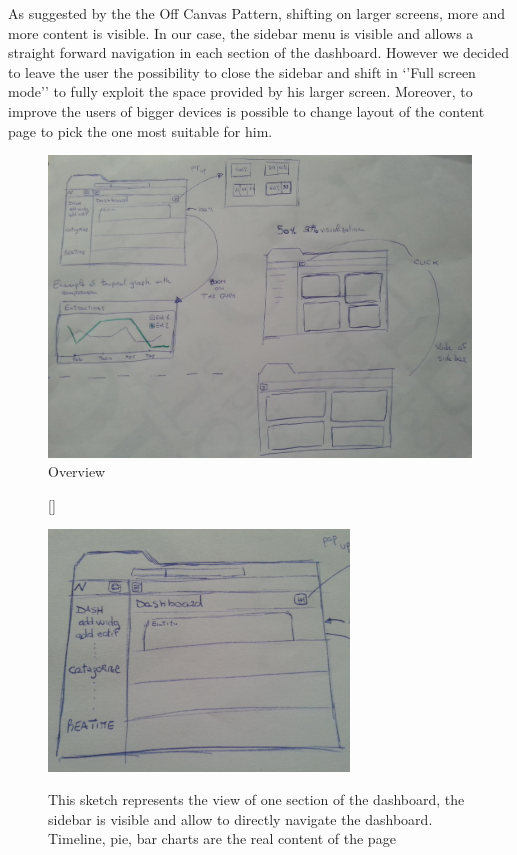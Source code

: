 \documentclass[a4paper,13pt]{report}
\begin{document}
As suggested by the  the Off Canvas Pattern, shifting on larger screens, more and more content is visible. In our case, the sidebar menu is visible and allows a straight forward navigation in each section of the dashboard. However we decided to leave the user the possibility to close the sidebar and shift in `'Full screen mode'' to fully exploit the space provided by his larger screen. Moreover, to improve the users of bigger devices is possible to change layout of the content page to pick the one most suitable for him.
\begin{figure}[H]
  \caption{Overview}
  \centering
    \includegraphics[width=1\textwidth]{pics/UISketches/desk0}
\end{figure}

\begin{figure}[H]
[\FBwidth]
{\caption{This sketch represents the view of one section of the dashboard, the sidebar is visible and allow to directly navigate the dashboard. Timeline, pie, bar charts are the real content of the page}\label{fig:test}}
{\includegraphics[width=8cm]{pics/UISketches/desk1}}
\end{figure}
\end{document}
